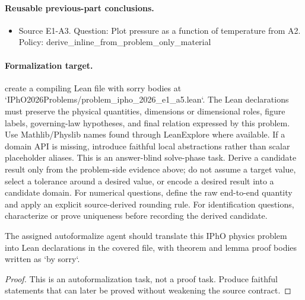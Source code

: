 \paragraph{Reusable previous-part conclusions.}
\begin{itemize}
\item Source E1-A3. Question: Plot pressure as a function of temperature from A2. Policy: derive\_inline\_from\_problem\_only\_material
\end{itemize}

\paragraph{Formalization target.}
create a compiling Lean file with sorry bodies at `IPhO2026Problems/problem\_ipho\_2026\_e1\_a5.lean`.
The Lean declarations must preserve the physical quantities, dimensions or dimensional roles, figure labels, governing-law hypotheses, and final relation expressed by this problem.
Use Mathlib/Physlib names found through LeanExplore where available. If a domain API is missing, introduce faithful local abstractions rather than scalar placeholder aliases.
This is an answer-blind solve-phase task. Derive a candidate result only from the problem-side evidence above; do not assume a target value, select a tolerance around a desired value, or encode a desired result into a candidate domain.
For numerical questions, define the raw end-to-end quantity and apply an explicit source-derived rounding rule. For identification questions, characterize or prove uniqueness before recording the derived candidate.

\begin{theorem}
\label{thm:physics:ipho_2026_e1_a5:target}
The assigned autoformalize agent should translate this IPhO physics problem into Lean declarations in the covered file, with theorem and lemma proof bodies written as `by sorry`.
\end{theorem}
\begin{proof}
This is an autoformalization task, not a proof task. Produce faithful statements that can later be proved without weakening the source contract.
\end{proof}
